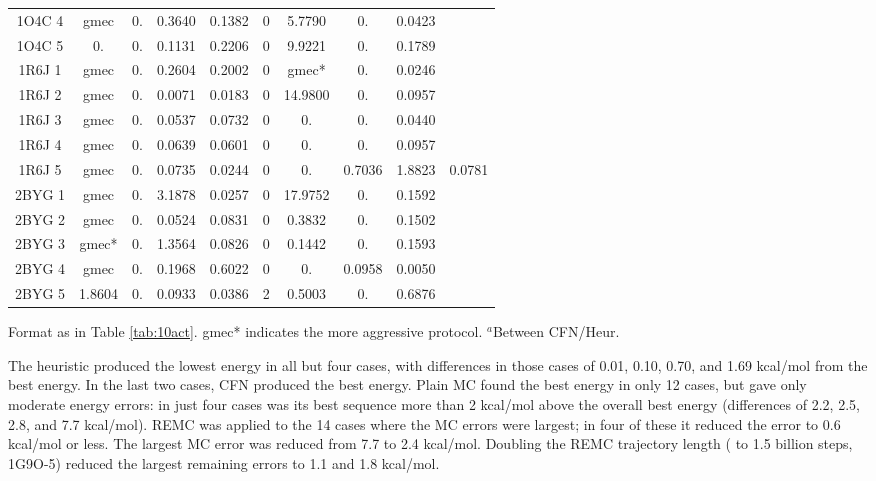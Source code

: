 \begin{table}[!htbp]
\begin{center}
\begin{tabular}{cccccccccc}
1O4C 4 &  gmec    & 0.     & 0.3640 & 0.1382 & 0 & 5.7790    & 0.     & 0.0423 &        \\             
1O4C 5 &  0.      & 0.     & 0.1131 & 0.2206 & 0 & 9.9221    & 0.     & 0.1789 &        \\      
1R6J 1 &  gmec    & 0.     & 0.2604 & 0.2002 & 0 & gmec*     & 0.     & 0.0246 &        \\        
1R6J 2 &  gmec    & 0.     & 0.0071 & 0.0183 & 0 & 14.9800   & 0.     & 0.0957 &        \\        
1R6J 3 &  gmec    & 0.     & 0.0537 & 0.0732 & 0 & 0.        & 0.     & 0.0440 &        \\       
1R6J 4 &  gmec    & 0.     & 0.0639 & 0.0601 & 0 & 0.        & 0.     & 0.0957 &        \\        
1R6J 5 &  gmec    & 0.     & 0.0735 & 0.0244 & 0 & 0.        & 0.7036 & 1.8823 & 0.0781 \\        
2BYG 1 &  gmec    & 0.     & 3.1878 & 0.0257 & 0 & 17.9752   & 0.     & 0.1592 &        \\        
2BYG 2 &  gmec    & 0.     & 0.0524 & 0.0831 & 0 & 0.3832    & 0.     & 0.1502 &        \\        
2BYG 3 &  gmec*   & 0.     & 1.3564 & 0.0826 & 0 & 0.1442    & 0.     & 0.1593 &        \\        
2BYG 4 &  gmec    & 0.     & 0.1968 & 0.6022 & 0 & 0.        & 0.0958 & 0.0050 &        \\        
2BYG 5 &  1.8604  & 0.     & 0.0933 & 0.0386 & 2 & 0.5003    & 0.     & 0.6876 &        \\   
\hline
\end{tabular}
{\small \noindent Format as in Table \ref{tab:10act}. gmec* indicates the more aggressive protocol.
$^a$Between CFN/Heur.}
\end{center}
\end{table}




The heuristic produced the lowest energy in all but four cases, with differences in those cases of 0.01, 0.10, 0.70, and 1.69 kcal/mol from the best energy. In the last two cases, CFN produced the best energy. Plain MC found the best energy in only 12 cases, but gave only moderate energy errors: in just four cases was its best sequence more than 2 kcal/mol above the overall best energy (differences of 2.2, 2.5, 2.8, and 7.7 kcal/mol). REMC was applied to the 14 cases where the MC errors were largest; in four of these it reduced the error to 0.6 kcal/mol or less. The largest MC error was reduced from 7.7 to 2.4 kcal/mol. Doubling the REMC trajectory length ( to 1.5 billion steps, 1G9O-5) reduced the largest remaining errors to 1.1 and 1.8 kcal/mol.

